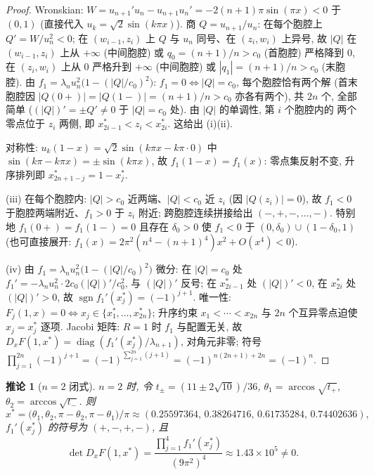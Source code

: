 \documentclass[UTF8]{ctexart}
\newtheorem{corollary}[theorem]{推论}
\begin{document}
\begin{proof}
Wronskian: $W=u_{n+1}'u_n-u_{n+1}u_n'=-2(n+1)\pi\sin(\pi x)<0$ 于 $(0,1)$
(直接代入 $u_k=\sqrt2\sin(k\pi x)$). 商 $Q=u_{n+1}/u_n$: 在每个胞腔上
$Q'=W/u_n^2<0$; 在 $(w_{i-1},z_i)$ 上 $Q$ 与 $u_n$ 同号、在 $(z_i,w_i)$ 上异号,
故 $|Q|$ 在 $(w_{i-1},z_i)$ 上从 $+\infty$ (中间胞腔) 或 $q_0=(n+1)/n>c_0$
(首胞腔) 严格降到 $0$, 在 $(z_i,w_i)$ 上从 $0$ 严格升到 $+\infty$ (中间胞腔)
或 $|q_1|=(n+1)/n>c_0$ (末胞腔). 由 $f_1=\lambda_nu_n^2\bigl(1-(|Q|/c_0)^2\bigr)$:
$f_1=0\iff|Q|=c_0$, 每个胞腔恰有两个解 (首末胞腔因
$|Q(0+)|=|Q(1-)|=(n+1)/n>c_0$ 亦各有两个), 共 $2n$ 个, 全部简单
($(|Q|)'=\pm Q'\neq0$ 于 $|Q|=c_0$ 处). 由 $|Q|$ 的单调性, 第 $i$ 个胞腔内的
两个零点位于 $z_i$ 两侧, 即 $x_{2i-1}^*<z_i<x_{2i}^*$. 这给出 (i)(ii).

对称性: $u_k(1-x)=\sqrt2\sin(k\pi x-k\pi\cdot0)$ 中
$\sin(k\pi-k\pi x)=\pm\sin(k\pi x)$, 故 $f_1(1-x)=f_1(x)$: 零点集反射不变,
升序排列即 $x_{2n+1-j}^*=1-x_j^*$.

(iii) 在每个胞腔内: $|Q|>c_0$ 近两端、$|Q|<c_0$ 近 $z_i$ (因 $|Q(z_i)|=0$),
故 $f_1<0$ 于胞腔两端附近、$f_1>0$ 于 $z_i$ 附近; 跨胞腔连续拼接给出
$(-,+,-,\dots,-)$. 特别地 $f_1(0+)=f_1(1-)=0$ 且存在 $\delta_0>0$ 使
$f_1<0$ 于 $(0,\delta_0)\cup(1-\delta_0,1)$ (也可直接展开:
$f_1(x)=2\pi^2(n^4-(n+1)^4)x^2+O(x^4)<0$).

(iv) 由 $f_1=\lambda_nu_n^2\bigl(1-(|Q|/c_0)^2\bigr)$ 微分: 在 $|Q|=c_0$ 处
$f_1'=-\lambda_nu_n^2\cdot2c_0(|Q|)'/c_0^2$, 与 $(|Q|)'$ 反号; 在
$x_{2i-1}^*$ 处 $(|Q|)'<0$, 在 $x_{2i}^*$ 处 $(|Q|)'>0$, 故
$\operatorname{sgn}f_1'(x_j^*)=(-1)^{j+1}$.
唯一性: $F_j(1,x)=0\iff x_j\in\{x_1^*,\dots,x_{2n}^*\}$; 升序约束
$x_1<\cdots<x_{2n}$ 与 $2n$ 个互异零点迫使 $x_j=x_j^*$ 逐项. Jacobi 矩阵:
$R=1$ 时 $f_1$ 与配置无关, 故 $D_xF(1,x^*)=\operatorname{diag}(f_1'(x_j^*)/\lambda_{n+1})$,
对角元非零; 符号
$\prod_{j=1}^{2n}(-1)^{j+1}=(-1)^{\sum_{j=1}^{2n}(j+1)}=(-1)^{n(2n+1)+2n}=(-1)^n$.
\end{proof}

\begin{corollary}[$n=2$ 闭式]\label{cor:r1n2}
$n=2$ 时, 令 $t_\pm=(11\pm2\sqrt{10})/36$,
$\theta_1=\arccos\sqrt{t_+}$, $\theta_2=\arccos\sqrt{t_-}$. 则
\begin{equation*}
	x^*=\bigl(\theta_1,\theta_2,\pi-\theta_2,\pi-\theta_1\bigr)/\pi
	\approx(0.25597364,\,0.38264716,\,0.61735284,\,0.74402636),
\end{equation*}
$f_1'(x_j^*)$ 的符号为 $(+,-,+,-)$, 且
\begin{equation*}
	\det D_xF(1,x^*)=\frac{\prod_{j=1}^4f_1'(x_j^*)}{(9\pi^2)^4}
	\approx1.43\times10^5\neq0.
\end{equation*}
\end{corollary}
\end{document}
